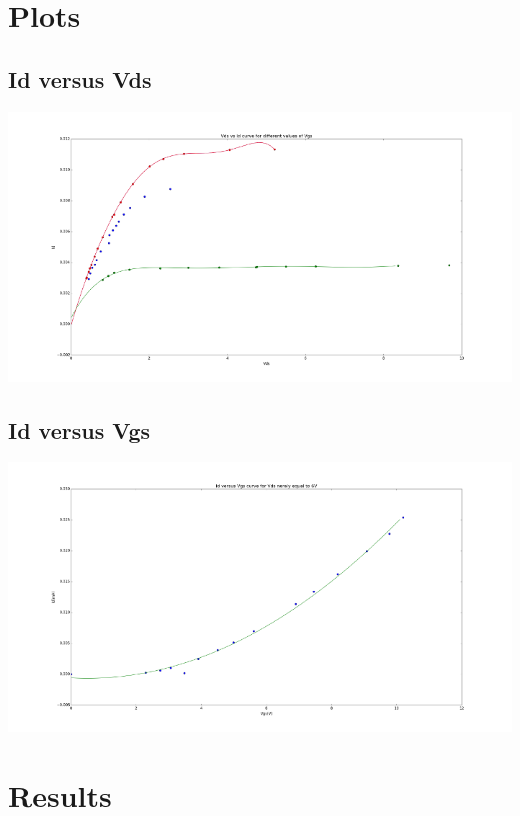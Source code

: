 \documentclass[12pt]{article}
\begin{document}
 
 

\section*{Plots}

\subsection*{Id versus Vds}
\begin{center}
    \includegraphics{figure_11.png}
\end{center}

\subsection*{Id versus Vgs}
\begin{center}
    \includegraphics{figure_22.png}
\end{center}

\section*{Results}
\end{document}
